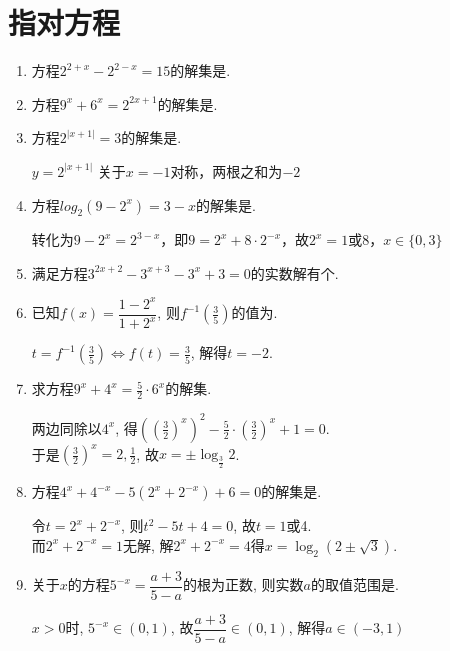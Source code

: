 \section*{指对方程}
\begin{enumerate}
    \item 方程$2^{2+x}-2^{2-x}=15$的解集是. 
    \item 方程$9^x+6^x=2^{2x+1}$的解集是. 
    \item 方程$2^{\left| {x+1} \right|}=3$的解集是.
    \begin{jieda}
    $y = 2^{\left| {x+1} \right|}$ 关于$x = -1$对称，两根之和为$-2$
    \end{jieda}
    \item 方程$log_2(9-2^x) = 3-x$的解集是.
    \begin{jieda}
        转化为$9-2^x = 2^{3-x}$，即$9 = 2^x + 8 \cdot 2^{-x}$，故$2^x = 1$或$8$，$x \in \{0, 3\}$
    \end{jieda}
    \item 满足方程$3^{2x+2}-3^{x+3}-3^x+3=0$的实数解有个.
    \item 已知$f(x)=\dfrac{1-2^x}{1+2^x}$, 则$f^{-1}(\frac{3}{5})$的值为.
    \begin{jieda}
    $t=f^{-1}(\frac{3}{5})\iff f(t)=\frac{3}{5}$, 解得$t=-2$. 
    \end{jieda}
    \item 求方程$9^x+4^x=\frac{5}{2}\cdot 6^x$的解集. 
    \begin{jieda}
    两边同除以$4^x$, 得$((\frac{3}{2})^x)^2-\frac{5}{2}\cdot(\frac{3}{2})^x+1=0$. \\
    于是$(\frac{3}{2})^x=2,\frac{1}{2}$, 故$x=\pm\log_{\frac{3}{2}}2$. 
    \end{jieda}
    \item 方程$4^x+4^{-x}-5(2^x+2^{-x})+6=0$的解集是.
    \begin{jieda}
    令$t=2^x+2^{-x}$, 则$t^2-5t+4=0$, 故$t=1$或4. \\
    而$2^x+2^{-x}=1$无解, 解$2^x+2^{-x}=4$得$x=\log_2(2\pm\sqrt{3})$. 
    \end{jieda}
    \item 关于$x$的方程$5^{-x}=\dfrac{a+3}{5-a}$的根为正数, 则实数$a$的取值范围是. 
    \begin{jieda}
    $x>0$时, $5^{-x}\in(0,1)$, 故$\dfrac{a+3}{5-a}\in(0,1)$, 解得$a\in(-3,1)$
    \end{jieda}
    

\end{enumerate}
